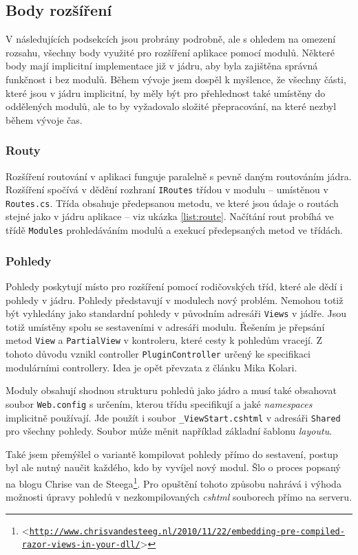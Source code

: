 \documentclass[11pt,twoside,a4paper]{book}
\let\oldUrl\url
\renewcommand\url[1]{<\texttt{\oldUrl{#1}}>}
\begin{document}
\subsection{Body rozšíření}

V následujících podsekcích jsou probrány podrobně, ale s ohledem na omezení rozsahu, všechny body využité pro rozšíření aplikace pomocí modulů. Některé body mají implicitní implementace již v jádru, aby byla zajištěna správná funkčnost i bez modulů. Během vývoje jsem dospěl k myšlence, že všechny části, které jsou v jádru implicitní, by měly být pro přehlednost také umístěny do oddělených modulů, ale to by vyžadovalo složité přepracování, na které nezbyl během vývoje čas.

\subsubsection{Routy}
Rozšíření routování v aplikaci funguje paralelně s pevně daným routováním jádra. Rozšíření spočívá v dědění rozhraní \texttt{IRoutes} třídou v modulu -- umístěnou v \texttt{Routes.cs}.
Třída obsahuje předepsanou metodu, ve které jsou údaje o routách stejné jako v jádru aplikace -- viz ukázka \ref{list:route}. Načítání rout probíhá ve třídě \texttt{Modules} prohledáváním modulů a exekucí předepsaných metod ve třídách.

\subsubsection{Pohledy}
\label{subsec:pohledy}
Pohledy poskytují místo pro rozšíření pomocí rodičovských tříd, které ale dědí i pohledy v jádru. Pohledy představují v modulech nový problém. Nemohou totiž být vyhledány jako standardní pohledy v původním adresáři \texttt{Views} v jádře. Jsou totiž umístěny spolu se sestaveními v adresáři modulu.
Řešením je přepsání metod \texttt{View} a \texttt{PartialView} v kontroleru, které cesty k pohledům vracejí. Z tohoto důvodu vznikl controller \texttt{PluginController} určený ke specifikaci modulárními controllery. Idea je opět převzata z článku Mika Kolari\cite{kolari}.

Moduly obsahují shodnou strukturu pohledů jako jádro a musí také obsahovat soubor \texttt{Web.config} s určením, kterou třídu specifikují a jaké \textit{namespaces} implicitně používají. Jde použít i soubor
\texttt{\_ViewStart.cshtml} v adresáři \texttt{Shared} pro všechny pohledy. Soubor může měnit například základní šablonu \textit{layoutu}.

Také jsem přemýšlel o variantě kompilovat pohledy přímo do sestavení, postup byl ale nutný naučit každého, kdo by vyvíjel nový modul. Šlo o proces popsaný na blogu Chrise van de Steega\footnote{\url{http://www.chrisvandesteeg.nl/2010/11/22/embedding-pre-compiled-razor-views-in-your-dll/}}. Pro opuštění tohoto způsobu nahrává i výhoda možnosti úpravy pohledů v nezkompilovaných \textit{cshtml} souborech přímo na serveru.
\end{document}
